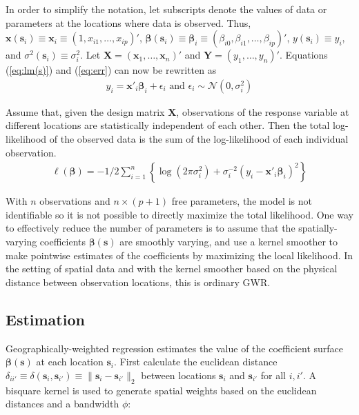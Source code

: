 \documentclass[authoryear, review, 11pt]{elsarticle}
\begin{document}
	In order to simplify the notation, let subscripts denote the values of data or parameters at the locations where data is observed. Thus, $\bm{x}(\bm{s}_i) \equiv \bm{x}_i \equiv \left( 1, x_{i1}, \dots, x_{ip} \right)'$, $\bm{\beta}(\bm{s}_i) \equiv \bm{\beta}_i \equiv \left(\beta_{i0}, \beta_{i1}, \dots, \beta_{ip} \right)'$, $y(\bm{s}_i) \equiv y_i$, and $\sigma^2(\bm{s}_i) \equiv \sigma^2_i$. Let $\bm{X} = \left( \bm{x}_1, \dots, \bm{x}_n \right)'$ and $\bm{Y} = \left( y_1, \dots, y_n \right)'$. Equations (\ref{eq:lm(s)}) and (\ref{eq:err}) can now be rewritten as
	\begin{eqnarray}
		y_i = \bm{x}'_i \bm{\beta}_i + \epsilon_i \text{ and } \epsilon_i \sim \mathcal{N} \left( 0,\sigma_i^2 \right)
	\end{eqnarray}
	
	Assume that, given the design matrix $\bm{X}$, observations of the response variable at different locations are statistically independent of each other. Then the total log-likelihood of the observed data is the sum of the log-likelihood of each individual observation.
	 \begin{eqnarray}
	 	\ell\left( \bm{\beta} \right) = - 1/2 \sum_{i=1}^n \left\{  \log \left( 2 \pi \sigma^2_i\right) +  \sigma^{-2}_i  \left(y_i - \bm{x}'_i\bm{\beta}_i \right)^2  \right\}
	\end{eqnarray}
	
	With $n$ observations and $n \times (p+1)$ free parameters, the model is not identifiable so it is not possible to directly maximize the total likelihood. One way to effectively reduce the number of parameters is to assume that the spatially-varying coefficients $\bm{\beta}(\bm{s})$ are smoothly varying, and use a kernel smoother to make pointwise estimates of the coefficients by maximizing the local likelihood. In the setting of spatial data and with the kernel smoother based on the physical distance between observation locations, this is ordinary GWR.
		
	\subsection{Estimation}		
	Geographically-weighted regression estimates the value of the coefficient surface $\bm{\beta}(\bm{s})$ at each location $\bm{s}_i$. First calculate the euclidean distance $\delta_{ii'} \equiv \delta\left(\bm{s}_i, \bm{s}_{i'}\right) \equiv \|\bm{s}_i  -\bm{s}_{i'}\|_2$ between locations $\bm{s}_i$ and $\bm{s}_{i'}$ for all $i, i'$. A bisquare kernel is used to generate spatial weights based on the euclidean distances and a bandwidth $\phi$:\\
	
\end{document}
